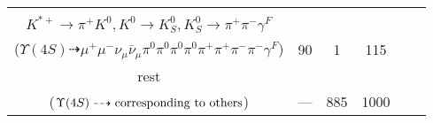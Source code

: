 \documentclass[landscape]{article}
\newcounter{rownumbers}
\newcommand\rn{\stepcounter{rownumbers}\arabic{rownumbers}}
\newcommand{\EOLP}{\\ \hline} %
\newcommand{\topoTags}[1]{#1} %
\begin{document}
\begin{longtable}{clcccc}
\rn & \makecell[l]{ $ 
\Upsilon(4S) \rightarrow B^{0} \bar{B}^{0} ,
B^{0} \rightarrow \mu^{+} \nu_{\mu} \pi^{-} \bar{D}^{*0} ,
\bar{B}^{0} \rightarrow \pi^{0} D^{0} ,
\bar{D}^{*0} \rightarrow \pi^{0} \bar{D}^{0} ,
D^{0} \rightarrow \pi^{0} \pi^{0} ,
\bar{D}^{0} \rightarrow \mu^{-} \bar{\nu}_{\mu} K^{*+} ,
$ \\ $
K^{*+} \rightarrow \pi^{+} K^{0} ,
K^{0} \rightarrow K_{S}^{0} ,
K_{S}^{0} \rightarrow \pi^{+} \pi^{-} \gamma^{F} 
$ \\ ($
\Upsilon(4S) \dashrightarrow \mu^{+} \mu^{-} \nu_{\mu} \bar{\nu}_{\mu} \pi^{0} \pi^{0} \pi^{0} \pi^{0} \pi^{+} \pi^{+} \pi^{-} \pi^{-} \gamma^{F} 
$) } & \topoTags{90 & }1 & 115 \EOLP

rest & \makecell[l]{ $ 
\Upsilon(4S) \rightarrow \rm{others \  (885 \  in \  total)}
$ \\ ($
\Upsilon(4S) \dashrightarrow \rm{corresponding\ to\ others}
$) } & \topoTags{--- & }885 & 1000 \\ \hline

\end{longtable}
\end{document}
